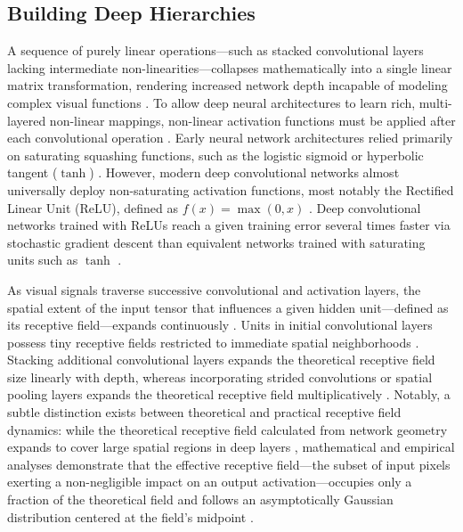 \subsection{Building Deep Hierarchies}

A sequence of purely linear operations---such as stacked convolutional layers lacking intermediate non-linearities---collapses mathematically into a single linear matrix transformation, rendering increased network depth incapable of modeling complex visual functions \parencite{Goodfellow-et-al-2016, Krizhevsky_ImageNET}. To allow deep neural architectures to learn rich, multi-layered non-linear mappings, non-linear activation functions must be applied after each convolutional operation \parencite{Goodfellow-et-al-2016, Krizhevsky_ImageNET, nair_relu_2010}. Early neural network architectures relied primarily on saturating squashing functions, such as the logistic sigmoid or hyperbolic tangent ($\tanh$) \parencite{rumelhart_learning_1986, lecun_backpropagation_1989, lecun_gradient-based_1998}. However, modern deep convolutional networks almost universally deploy non-saturating activation functions, most notably the Rectified Linear Unit (ReLU), defined as $f(x) = \max(0, x)$ \parencite{nair_relu_2010, Krizhevsky_ImageNET, simonyan_very_2014}. Deep convolutional networks trained with ReLUs reach a given training error several times faster via stochastic gradient descent than equivalent networks trained with saturating units such as $\tanh$ \parencite{Krizhevsky_ImageNET}.

As visual signals traverse successive convolutional and activation layers, the spatial extent of the input tensor that influences a given hidden unit---defined as its receptive field---expands continuously \parencite{Goodfellow-et-al-2016, luo_understanding_2017, fukushima_neocognitron_1980}. Units in initial convolutional layers possess tiny receptive fields restricted to immediate spatial neighborhoods \parencite{Goodfellow-et-al-2016, luo_understanding_2017}. Stacking additional convolutional layers expands the theoretical receptive field size linearly with depth, whereas incorporating strided convolutions or spatial pooling layers expands the theoretical receptive field multiplicatively \parencite{simonyan_very_2014, luo_understanding_2017, Goodfellow-et-al-2016}. Notably, a subtle distinction exists between theoretical and practical receptive field dynamics: while the theoretical receptive field calculated from network geometry expands to cover large spatial regions in deep layers \parencite{Goodfellow-et-al-2016, luo_understanding_2017}, mathematical and empirical analyses demonstrate that the effective receptive field---the subset of input pixels exerting a non-negligible impact on an output activation---occupies only a fraction of the theoretical field and follows an asymptotically Gaussian distribution centered at the field's midpoint \parencite{luo_understanding_2017}.

